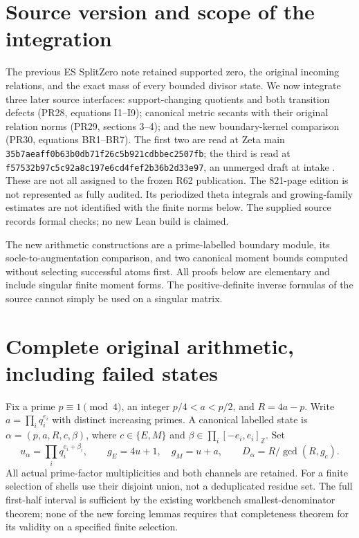 \section{Source version and scope of the integration}
The previous ES SplitZero note retained supported zero, the original incoming
relations, and the exact mass of every bounded divisor state. We now integrate
three later source interfaces: support-changing quotients and both transition
defects (PR28, equations I1--I9); canonical metric secants with their original
relation norms (PR29, sections 3--4); and the new boundary-kernel comparison
(PR30, equations BR1--BR7). The first two are read at Zeta main
\texttt{35b7aeaff0b63b0db71f26c5b921cdbbec2507fb}; the third is read at
\texttt{f57532b97c5c92a8c197e6cd4fef2b36b2d33e97}, an unmerged draft at intake
\cite{SZ28,SZ29,SZ30}. These are not all assigned to the frozen R62 publication.
The 821-page edition is not represented as fully audited. Its periodized theta
integrals and growing-family estimates are not identified with the finite norms
below. The supplied source records formal checks; no new Lean build is claimed.

The new arithmetic constructions are a prime-labelled boundary module, its
socle-to-augmentation comparison, and two canonical moment bounds computed
without selecting successful atoms first. All proofs below are elementary and
include singular finite moment forms. The positive-definite inverse formulas of
the source cannot simply be used on a singular matrix.

\section{Complete original arithmetic, including failed states}
Fix a prime $p\equiv1\pmod4$, an integer $p/4<a<p/2$, and $R=4a-p$.
Write $a=\prod_i q_i^{e_i}$ with distinct increasing primes. A canonical labelled
state is $\alpha=(p,a,R,c,\beta)$, where $c\in\{E,M\}$ and
$\beta\in\prod_i[-e_i,e_i]_{\mathbb Z}$. Set
\[
 u_\alpha=\prod_iq_i^{e_i+\beta_i},\qquad
 g_E=4u+1,\quad g_M=u+a,\qquad D_\alpha=R/\gcd(R,g_c).
 \tag{A1}
\]
All actual prime-factor multiplicities and both channels are retained. For a
finite selection of shells use their disjoint union, not a deduplicated residue
set. The full first-half interval is sufficient by the existing workbench
smallest-denominator theorem; none of the new forcing lemmas requires that
completeness theorem for its validity on a specified finite selection.

